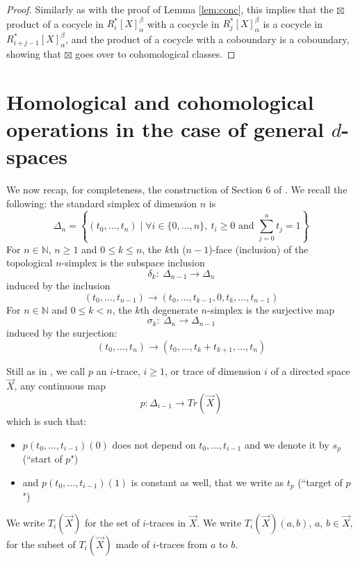 \documentclass{article}
\newtheorem{definition}{Definition}[section]
\newcommand\N[0]{\mathbb{N}}
\begin{document}
\begin{proof} 
Similarly as with the proof of Lemma \ref{lem:conc}, this implies that the $\boxtimes$ product of a cocycle in $R^*_{i}[X]^\beta_\alpha$ with a cocycle in $R^*_{j}[X]^\beta_\alpha$ is a cocycle in $R^*_{i+j-1}[X]^\beta_\alpha$, and the product of a cocycle with a coboundary is a coboundary, showing that 
$\boxtimes$ goes over to cohomological classes. 
\end{proof}


\section{Homological and cohomological operations in the case of general $d$-spaces}

\label{sec:dspace}



We now recap, for completeness, the construction of Section 6 of \cite{semi-ab}. 
We recall the following: 
the standard simplex of dimension $n$ is $$
\Delta_n=\left\{(t_0,\ldots,t_n) \mid \forall i\in \{0,\ldots,n\}, \ t_i \geq 0 \mbox{ and } \sum\limits_{j=0}^n t_j=1\right\}
$$
For $n \in \N$, $n
\geq 1$ and $0 \leq k \leq n$, the $k$th ($n-1$)-face (inclusion) of the topological $n$-simplex is the subspace inclusion
$$\delta_k: \ \Delta_{n-1} \rightarrow \Delta_n$$
induced by the inclusion
$$(t_0,\ldots,t_{n-1}) \rightarrow (t_0,\ldots,t_{k-1},0,t_k,
\ldots, t_{n-1})$$
For $n \in \N$ and $0\leq k < n$, the 
$k$th degenerate 
$n$-simplex is the surjective map
$$
\sigma_k: \ \Delta_n \rightarrow \Delta_{n-1}$$
\noindent induced by the surjection: 
$$(t_0,\ldots,t_n)\rightarrow (t_0,\ldots,t_{k}+t_{k+1},\ldots,t_n)$$

Still as in \cite{semi-ab},  
we call $p$ an $i$-trace, $i\geq 1$, or trace of dimension $i$ of a directed space $\Vec{X}$, any 
 continuous map 
$$p: \Delta_{i-1} \rightarrow Tr(\Vec{X})$$ 
\noindent which is such that: 
\begin{itemize}
\item $p(t_0,\ldots,t_{i-1})(0)$ does not depend on $t_0,\ldots,t_{i-1}$ and we denote it by $s_p$ (``start of $p$")
\item and $p(t_0,\ldots,t_{i-1})(1)$ is constant as well, that we write as $t_p$ (``target of $p$")
\end{itemize}
We write $T_i(\Vec{X})$ for the set of $i$-traces in $\Vec{X}$. We write $T_i(\Vec{X})(a,b)$, $a$, $b \in \Vec{X}$, for the subset of $T_i(\Vec{X})$ made of $i$-traces from $a$ to $b$. 
\end{document}
